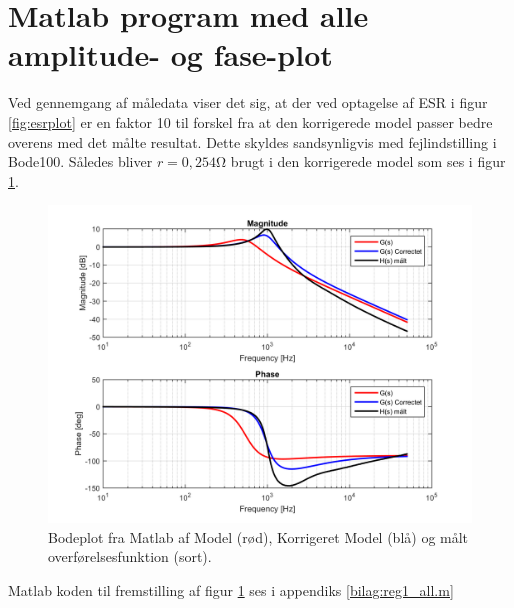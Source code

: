 \section{Matlab program med alle amplitude- og fase-plot}\label{sec:spm5}

Ved gennemgang af måledata viser det sig, at der ved optagelse af ESR i figur \ref{fig:esrplot} er en faktor 10 til forskel fra at den korrigerede model passer bedre overens med det målte resultat.
Dette skyldes sandsynligvis med fejlindstilling i Bode100. 
Således bliver $r = 0,254 \si{\ohm}$ brugt i den korrigerede model som ses i figur \ref{fig:bodeplot_all}. 

\begin{figure}[h!]
	\centering
	\includegraphics[width=.8\textwidth]{reg1/bodeplot_all.png}
	\caption{Bodeplot fra Matlab af Model (rød), Korrigeret Model (blå) og målt overførelsesfunktion (sort).}
	\label{fig:bodeplot_all}
\end{figure}
\FloatBlock

Matlab koden til fremstilling af figur \ref{fig:bodeplot_all} ses i appendiks \ref{bilag:reg1_all.m}
